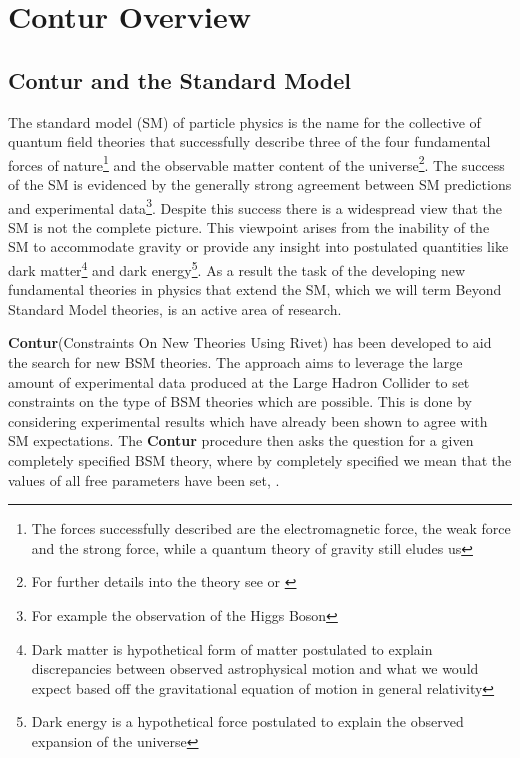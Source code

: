 \chapter{Contur Overview}
\label{chapterlabel2}

\section{Contur and the Standard Model}
The standard model (SM) of particle physics is the name for the collective of quantum field theories that successfully describe three of the four fundamental forces of nature\footnote{The forces successfully described are the electromagnetic force, the weak force and the strong force, while a quantum theory of gravity still eludes us} and the observable matter content of the universe\footnote{For further details into the theory see \cite{sm_text_1} or \cite{sm_text_2}}. The success of the SM is evidenced by the generally strong agreement between SM predictions and experimental data\footnote{For example the observation of the Higgs Boson\cite{sm_prove}}. Despite this success there is a widespread view that the SM is not the complete picture. This viewpoint arises from the inability of the SM to accommodate gravity or provide any insight into postulated quantities like dark matter\footnote{Dark matter is hypothetical form of matter postulated to explain discrepancies between observed astrophysical motion and what we would expect based off the gravitational equation of motion in general relativity} and dark energy\footnote{Dark energy is a hypothetical force postulated to explain the observed expansion of the universe}. As a result the task of the developing new fundamental theories in physics that extend the SM, which we will term Beyond Standard Model theories, is an active area of research.

\textbf{Contur}(Constraints On New Theories Using Rivet) has been developed to aid the search for new BSM theories. The approach aims to leverage the large amount of experimental data produced at the Large Hadron Collider to set constraints on the type of BSM theories which are possible. This is done by considering experimental results which have already been shown to agree with SM expectations. The \textbf{Contur} procedure then asks  the question for a given completely specified BSM theory, where by completely specified we mean that the values of all free parameters have been set, . 

